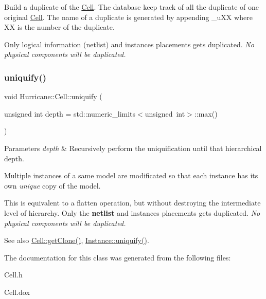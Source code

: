 Build a duplicate of the \mbox{\hyperlink{classHurricane_1_1Cell}{Cell}}. The database keep track of all the duplicate of one original \mbox{\hyperlink{classHurricane_1_1Cell}{Cell}}. The name of a duplicate is generated by appending {\ttfamily \textquotesingle{}\+\_\+u\+XX\textquotesingle{}} where {\ttfamily \textquotesingle{}XX\textquotesingle{}} is the number of the duplicate.

Only logical information (netlist) and instance\textquotesingle{}s placements gets duplicated. {\itshape No physical components will be duplicated.} \mbox{\label{classHurricane_1_1Cell_aa113c121813342b6304f3e7fddbc8565}} 
\subsubsection{\texorpdfstring{uniquify()}{uniquify()}}
{\footnotesize\ttfamily void Hurricane\+::\+Cell\+::uniquify (\begin{DoxyParamCaption}\item[{unsigned int}]{depth = {\ttfamily std\+:\+:numeric\+\_\+limits$<$unsigned~int$>$\+:\+:max()} }\end{DoxyParamCaption})}


\begin{DoxyParams}{Parameters}
{\em depth} & Recursively perform the uniquification until that hierarchical depth.\\
\hline
\end{DoxyParams}
Multiple instances of a same model are modificated so that each instance has it\textquotesingle{}s own {\itshape unique} copy of the model.

This is equivalent to a flatten operation, but without destroying the intermediate level of hierarchy. Only the {\bfseries netlist} and instance\textquotesingle{}s placements gets duplicated. {\itshape No physical components will be duplicated.}

\begin{DoxySeeAlso}{See also}
\mbox{\hyperlink{classHurricane_1_1Cell_a092f53c7f517ecc70d9ba375296c5d5b}{Cell\+::get\+Clone()}}, \mbox{\hyperlink{classHurricane_1_1Instance_adf28fcd01f6ff89c5435e83482f66d4c}{Instance\+::uniquify()}}. 
\end{DoxySeeAlso}


The documentation for this class was generated from the following files\+:\begin{DoxyCompactItemize}
\item 
Cell.\+h\item 
Cell.\+dox\end{DoxyCompactItemize}
